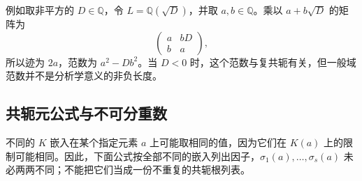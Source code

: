 \ProseParagraphBreak

例如取非平方的 \(D\in\mathbb Q\)，令 \(L=\mathbb Q(\sqrt D)\)，并取 \(a,b\in\mathbb Q\)。乘以 \(a+b\sqrt D\) 的矩阵为
\[
	\begin{pmatrix}a&bD\\ b&a\end{pmatrix},
\]
所以迹为 \(2a\)，范数为 \(a^2-Db^2\)。当 \(D<0\) 时，这个范数与复共轭有关，但一般域范数并不是分析学意义的非负长度。

\subsection{共轭元公式与不可分重数}
\label{b1:subsec:1802:03}

不同的 \(K\) 嵌入在某个指定元素 \(a\) 上可能取相同的值，因为它们在 \(K(a)\) 上的限制可能相同。因此，下面公式按全部不同的嵌入列出因子，\(\sigma_1(a),\ldots,\sigma_s(a)\) 未必两两不同；不能把它们当成一份不重复的共轭根列表。

